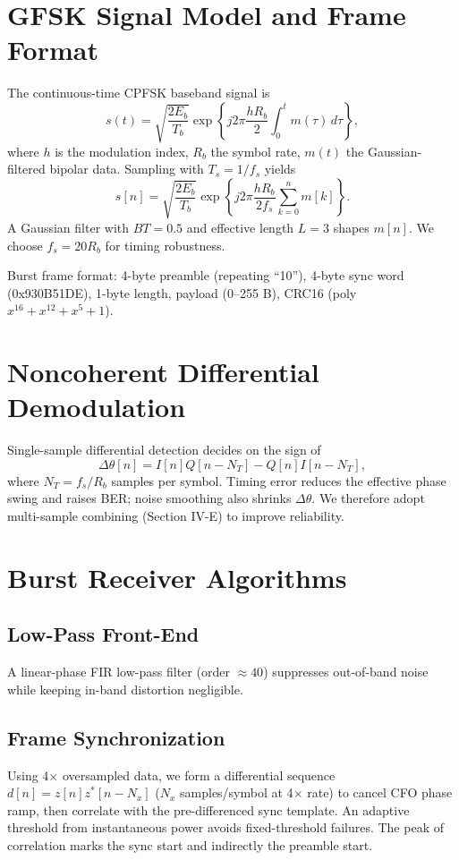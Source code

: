 \documentclass[journal]{IEEEtran}
\begin{document}
\section{GFSK Signal Model and Frame Format}
The continuous-time CPFSK baseband signal is
\begin{equation}
s(t)=\sqrt{\frac{2E_b}{T_b}}\exp\left\{j2\pi \frac{hR_b}{2}\int_{0}^{t} m(\tau)\,d\tau\right\},
\end{equation}
where $h$ is the modulation index, $R_b$ the symbol rate, $m(t)$ the Gaussian-filtered bipolar data. Sampling with $T_s=1/f_s$ yields
\begin{equation}
s[n]=\sqrt{\frac{2E_b}{T_b}}\exp\left\{j2\pi\frac{hR_b}{2f_s}\sum_{k=0}^{n} m[k]\right\}.
\end{equation}
A Gaussian filter with $BT=0.5$ and effective length $L=3$ shapes $m[n]$. We choose $f_s=20R_b$ for timing robustness.

Burst frame format: 4-byte preamble (repeating ``10''), 4-byte sync word (0x930B51DE), 1-byte length, payload (0--255 B), CRC16 (poly $x^{16}+x^{12}+x^{5}+1$).

\section{Noncoherent Differential Demodulation}
Single-sample differential detection decides on the sign of
\begin{equation}
\Delta\theta[n]=I[n]Q[n-N_T]-Q[n]I[n-N_T],
\end{equation}
where $N_T=f_s/R_b$ samples per symbol. Timing error reduces the effective phase swing and raises BER; noise smoothing also shrinks $\Delta\theta$. We therefore adopt multi-sample combining (Section IV-E) to improve reliability.

\section{Burst Receiver Algorithms}
\subsection{Low-Pass Front-End}
A linear-phase FIR low-pass filter (order $\approx 40$) suppresses out-of-band noise while keeping in-band distortion negligible.

\subsection{Frame Synchronization}
Using 4$\times$ oversampled data, we form a differential sequence $d[n]=z[n]z^{*}[n-N_x]$ ($N_x$ samples/symbol at 4$\times$ rate) to cancel CFO phase ramp, then correlate with the pre-differenced sync template. An adaptive threshold from instantaneous power avoids fixed-threshold failures. The peak of correlation marks the sync start and indirectly the preamble start.
\end{document}
